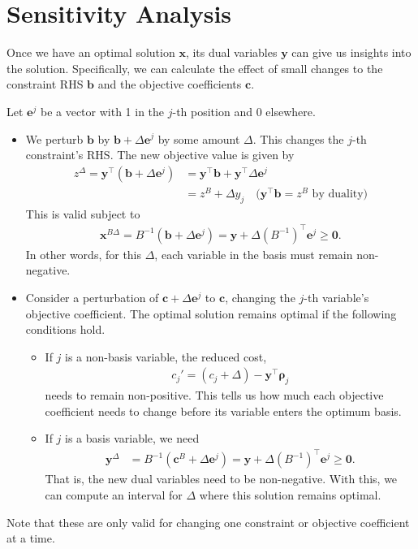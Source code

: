 \documentclass[12pt,a4paper]{article} %
\begin{document}
\newpage
\section{Sensitivity Analysis}
Once we have an optimal solution $\bm x$, its dual variables $\bm y$ can give us insights 
into the solution. Specifically, we can calculate the effect of small 
changes to the constraint RHS $\bm b$ and the objective coefficients $\bm c$.

Let $\bm e^j$ be a vector with 1 in the $j$-th position and 0 elsewhere. 

\begin{itemize}
    \item We perturb $\bm b$ by $\bm b + \Delta \bm e^j$ by some amount $\Delta$.
    This changes the $j$-th constraint's RHS.
    The new objective value is given by 
    \begin{align*}
        z^\Delta = \bm y^\top (\bm b + \Delta \bm e^j) &= \bm y^\top \bm b + \bm y^\top \Delta \bm e^j \\ 
        &= z^B + \Delta y_j \quad \text{($\bm y^\top \bm b = z^B$ by duality)}
    \end{align*}
    This is valid subject to
    \begin{align*}
        \bm x^{B\Delta} = B^{-1}(\bm b + \Delta \bm e^j) = \bm y + \Delta (B^{-1})^\top \bm e^j \ge \bm 0.
    \end{align*}
    In other words, for this $\Delta$, 
    each variable in the basis must remain non-negative.

    \item Consider a perturbation of $\bm c + \Delta \bm e^j$ to $\bm c$, 
    changing the $j$-th variable's objective coefficient. 
    The optimal solution remains optimal if the following conditions hold.
    \begin{itemize}
        \item If $j$ is a non-basis variable, the reduced cost, 
        \begin{align*}
            c_j' = (c_j+\Delta) - \bm y^\top \bm \rho_j
        \end{align*} 
        needs to remain non-positive.
        This tells us how much each objective coefficient needs to change before its 
        variable enters the optimum basis.
        \item If $j$ is a basis variable, we need
        \begin{align*}
            \bm y^\Delta &= B^{-1}(\bm c^B + \Delta \bm e^j) = \bm y+\Delta (B^{-1})^\top \bm e^j \ge \bm 0.
        \end{align*}
        That is, the new dual variables need to be non-negative. 
        With this, we can compute an interval for $\Delta$ 
         where this solution remains optimal.
    \end{itemize}
\end{itemize}
Note that these are only valid for changing one constraint or  objective 
coefficient at a time.
\end{document}

